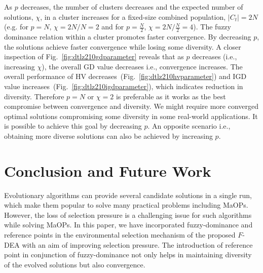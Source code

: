 \documentclass[review]{elsarticle}
\begin{document}
As $p$ decreases, the number of clusters decreases and the expected number of solutions, $\chi$, in a cluster increases for a fixed-size combined population, $\left|C_t\right| = 2N$ (e.g. for $p = N$, $\chi=2N/N=2$ and for $p = \frac{N}{2}$, $\chi = 2N/\frac{N}{2} = 4$).
The fuzzy dominance relation within a cluster promotes faster convergence. By decreasing $p$, the solutions achieve faster convergence while losing some diversity. A closer inspection of Fig.~\ref{fig:dtlz210gdparameter} reveals  that as $p$ decreases (i.e., increasing $\chi$), the overall GD value decreases i.e., convergence increases. The overall performance of HV decreases~(Fig.~\ref{fig:dtlz210hvparameter}) and IGD value increases~(Fig.~\ref{fig:dtlz210igdparameter}), which indicates reduction in diversity. Therefore $p=N$ or $\chi=2$ is  preferable as it works as the best compromise between convergence and diversity.
We might require more converged optimal solutions compromising some diversity in some real-world applications. It is possible to achieve this goal by decreasing $p$. An opposite scenario i.e., obtaining more diverse solutions can also be achieved by increasing $p$.


%
%



\section{Conclusion and Future Work}
\label{sec:conclusion}

Evolutionary algorithms can provide several candidate solutions in a single run, which make them popular to solve many practical problems including MaOPs. However, the loss of selection pressure is a challenging issue for such algorithms while solving MaOPs. 
In this paper, we have incorporated fuzzy-dominance and reference points in the environmental selection mechanism of the proposed  
$F$-DEA with an aim of improving selection pressure. The introduction of reference point in conjunction of fuzzy-dominance not only helps in maintaining diversity of the evolved solutions but also convergence.
\end{document}
